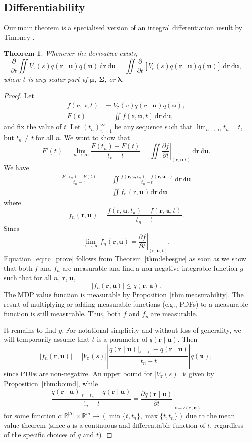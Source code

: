 \documentclass{mpaper}
\newtheorem{theorem}{Theorem}[section]
\newcommand{\V}{V_{\mathbf{r}}}
\newcommand{\dx}{\,\mathrm{d}\mathbf{r}\,\mathrm{d}\mathbf{u}}
\newcommand{\f}{f(\mathbf{r}, \mathbf{u}, t)}
\newcommand{\fn}{f_n(\mathbf{r}, \mathbf{u})}
\newcommand{\ftn}{f(\mathbf{r}, \mathbf{u}, t_n)}
\newcommand{\g}{g(\mathbf{r}, \mathbf{u})}
\newcommand{\dt}{\frac{\partial}{\partial t}}
\newcommand{\df}{\left.\frac{\partial f}{\partial t}\right|_{(\mathbf{r},
    \mathbf{u}, t)}}
\begin{document}
\subsection{Differentiability} \label{sec:the_proof}

Our main theorem is a specialised version of an integral differentiation result
by Timoney \cite{lecture_notes}.
\begin{theorem} \label{thm:main}
  Whenever the derivative exists,
  \[
    \dt\iint
    \V(s)q(\mathbf{r} \mid \mathbf{u})q(\mathbf{u})\dx
    = \iint
    \dt[\V(s)q(\mathbf{r} \mid \mathbf{u})q(\mathbf{u})]\dx,
  \]
  where $t$ is any scalar part of $\bm\mu$, $\bm\Sigma$, or $\bm\lambda$.
\end{theorem}
\begin{proof}
  Let
  \begin{align*}
    \f &= \V(s)q(\mathbf{r} \mid \mathbf{u})q(\mathbf{u}), \\
    F(t) &= \iint \f\dx,
  \end{align*}
  and fix the value of $t$. Let $(t_n)_{n=1}^\infty$ be any sequence such that
  $\lim_{n \to \infty} t_n = t$, but $t_n \ne t$ for all $n$. We want to show
  that
  \begin{equation} \label{eq:to_prove}
    F'(t) = \lim_{n \to \infty} \frac{F(t_n) - F(t)}{t_n - t} = \iint \df\dx.
  \end{equation}
  We have
  \[
    \begin{split}
      \frac{F(t_n) - F(t)}{t_n - t} &= \iint \frac{\ftn - \f}{t_n - t}\dx \\
      &= \iint \fn\dx,
    \end{split}
  \]
  where
  \[
    \fn = \frac{\ftn - \f}{t_n - t}.
  \]
  Since
  \[
    \lim_{n \to \infty} \fn = \df,
  \]
  Equation~\eqref{eq:to_prove} follows from Theorem~\ref{thm:lebesgue} as soon
  as we show that both $f$ and $f_n$ are measurable and find a non-negative
  integrable function $g$ such that for all $n$, $\mathbf{r}$, $\mathbf{u}$,
  \[
    |\fn| \le \g.
  \]
  The MDP value function is measurable by Proposition~\ref{thm:measurability}.
  The result of multiplying or adding measurable functions (e.g., PDFs) to a
  measurable function is still measurable. Thus, both $f$ and $f_n$ are
  measurable.

  It remains to find $g$. For notational simplicity and without loss of
  generality, we will temporarily assume that $t$ is a parameter of
  $q(\mathbf{r} \mid \mathbf{u})$. Then
  \[
    |\fn| = |\V(s)| \left| \frac{q(\mathbf{r} \mid \mathbf{u})|_{t =
          t_n} - q(\mathbf{r} \mid \mathbf{u})}{t_n - t} \right| q(\mathbf{u}),
  \]
  since PDFs are non-negative. An upper bound for
  $|\V(s)|$ is given by Proposition~\ref{thm:bound}, while
  \[
    \frac{q(\mathbf{r} \mid \mathbf{u})|_{t = t_n} - q(\mathbf{r} \mid \mathbf{u})}{t_n - t} = \left.
      \frac{\partial q(\mathbf{r} \mid \mathbf{u})}{\partial t} \right|_{t = c(\mathbf{r},
      \mathbf{u})}
  \]
  for some function $c : \mathbb{R}^{|\mathcal{S}|} \times \mathbb{R}^m \to
  (\min\{t, t_n\}, \max\{t, t_n\})$ due to the mean value theorem (since $q$ is
  a continuous and differentiable function of $t$, regardless of the specific
  choices of $q$ and $t$).


\end{proof}
\end{document}
